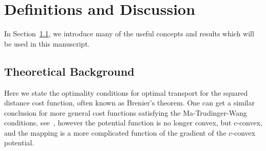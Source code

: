 \documentclass{amsart}
\theoremstyle{lemma}
\theoremstyle{remark}
\begin{document}
\section{Definitions and Discussion}\label{sec:definitions}
In Section~\ref{sec:theoreticalbackground}, we introduce many of the useful concepts and results which will be used in this manuscript.

\subsection{Theoretical Background}\label{sec:theoreticalbackground}

Here we state the optimality conditions for optimal transport for the squared distance cost function, often known as Brenier's theorem. One can get a similar conclusion for more general cost functions satisfying the Ma-Trudinger-Wang conditions, see~\cite{MTW}, however the potential function is no longer convex, but $c$-convex, and the mapping is a more complicated function of the gradient of the $c$-convex potential.
\end{document}
